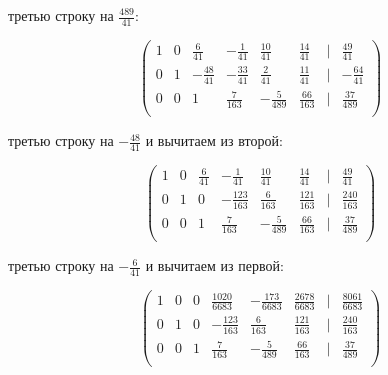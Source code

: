 \documentclass{report}
\begin{document}
\begin{itemize}
\begin{enumerate}
			
			\begin{itemize}
				
				 третью строку на $\frac{489}{41}$:
				
				\begin{center}
					\Large{
						\[
						\begin{pmatrix}
							1 & 0 & \frac{6}{41} & -\frac{1}{41} & \frac{10}{41} & \frac{14}{41} & | & \frac{49}{41} \\
							0 & 1 & -\frac{48}{41} & -\frac{33}{41} & \frac{2}{41} & \frac{11}{41} & | & -\frac{64}{41} \\
							0 & 0 & 1 & \frac{7}{163} & -\frac{5}{489} & \frac{66}{163} & | & \frac{37}{489} \\
						\end{pmatrix}
						\]
					}
				\end{center}
				
				 третью строку на $-\frac{48}{41}$ и вычитаем из второй:
				
								\begin{center}
					\Large{
						\[
						\begin{pmatrix}
							1 & 0 & \frac{6}{41} & -\frac{1}{41} & \frac{10}{41} & \frac{14}{41} & | & \frac{49}{41} \\
							0 & 1 & 0 & -\frac{123}{163} & \frac{6}{163} & \frac{121}{163} & | & \frac{240}{163} \\
							0 & 0 & 1 & \frac{7}{163} & -\frac{5}{489} & \frac{66}{163} & | & \frac{37}{489} \\
						\end{pmatrix}
						\]
					}
				\end{center}
				
				 третью строку на $-\frac{6}{41}$ и вычитаем из первой:
				
				
\begin{center}
	\Large{
		\[
		\begin{pmatrix}
			1 & 0 & 0 & \frac{1020}{6683} & -\frac{173}{6683} & \frac{2678}{6683} & | & \frac{8061}{6683} \\
			0 & 1 & 0 & -\frac{123}{163} & \frac{6}{163} & \frac{121}{163} & | & \frac{240}{163} \\
			0 & 0 & 1 & \frac{7}{163} & -\frac{5}{489} & \frac{66}{163} & | & \frac{37}{489} \\
		\end{pmatrix}
		\]
	}
\end{center}
				
			\end{itemize}
			\end{enumerate}


\end{itemize}
\end{document}
